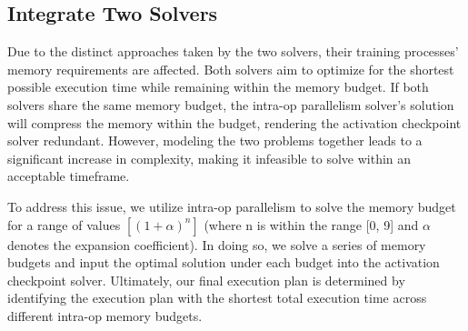 \subsection{Integrate Two Solvers}

Due to the distinct approaches taken by the two solvers, their training processes' memory requirements are affected. Both solvers aim to optimize for the shortest possible execution time while remaining within the memory budget. If both solvers share the same memory budget, the intra-op parallelism solver's solution will compress the memory within the budget, rendering the activation checkpoint solver redundant. However, modeling the two problems together leads to a significant increase in complexity, making it infeasible to solve within an acceptable timeframe.

To address this issue, we utilize intra-op parallelism to solve the memory budget for a range of values $[(1+\alpha)^n]$ (where n is within the range [0, 9] and $\alpha$ denotes the expansion coefficient). In doing so, we solve a series of memory budgets and input the optimal solution under each budget into the activation checkpoint solver. Ultimately, our final execution plan is determined by identifying the execution plan with the shortest total execution time across different intra-op memory budgets.
